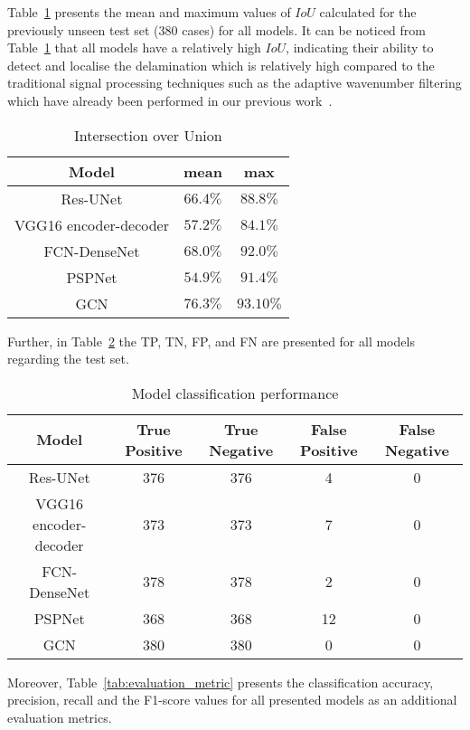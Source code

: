 \clearpage
Table~\ref{tab:table_iou} presents the mean and maximum values of \(IoU\) calculated for the previously unseen test set (380 cases) for all models.
It can be noticed from Table~\ref{tab:table_iou}  that all models have a relatively high \(IoU\), indicating their ability to detect and localise the delamination which is relatively high compared to the traditional signal processing techniques such as the adaptive wavenumber filtering which have already been performed in our previous work~\cite{Ijjeh2021}.
\begin{table}[]
	\centering
	\caption{Intersection over Union}
	\label{tab:table_iou}
	\begin{tabular}{ccc}\hline
		Model & mean & max \\ \hline
		Res-UNet & \(66.4\%\) & \(88.8\%\) \\ 
		VGG16 encoder-decoder & \(57.2\%\) & \(84.1\%\) \\ 
		FCN-DenseNet & \(68.0\%\) & \(92.0\%\) \\ 
		PSPNet & \(54.9\%\) & \(91.4\%\) \\ 
		GCN & \(76.3\%\) & \(93.10\%\) \\ \hline
	\end{tabular}
\end{table}
Further, in Table~\ref{tab:table_performance} the TP, TN, FP, and FN are presented for all models regarding the test set. 
\begin{table}[]
	\centering
	\caption{Model classification performance}
	\label{tab:table_performance}
	\resizebox{\textwidth}{!}
	{
		\begin{tabular}{ccccc} \hline
			Model& True Positive & True Negative & False Positive & False Negative \\ \hline
			Res-UNet & 376 & 376 & 4 & 0 \\ 
			VGG16 encoder-decoder & 373 & 373 & 7 & 0 \\ 
			FCN-DenseNet & 378 & 378 & 2 & 0 \\ 
			PSPNet & 368 & 368 & 12 & 0 \\ 
			GCN & 380 & 380 & 0 & 0 \\ \hline
		\end{tabular}
	}
\end{table}
Moreover, Table~\ref{tab:evaluation_metric} presents the classification accuracy, precision, recall and the F1-score values for all presented models as an additional evaluation metrics.
